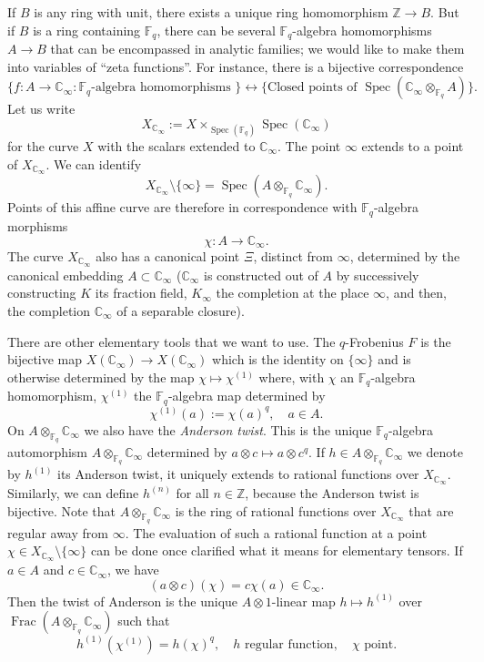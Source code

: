 \documentclass[11pt]{amsart}
\numberwithin{equation}{section}
\newcommand{\ZZ}{\mathbb{Z}}
\newcommand{\FF}{\mathbb{F}}
\newcommand{\CC}{\mathbb{C}}
\begin{document}
 If $B$ is any ring with unit, there exists a unique ring homomorphism $\ZZ\rightarrow B$. 
 But if $B$ is a ring containing $\FF_q$, there can be several $\FF_q$-algebra homomorphisms $A\rightarrow B$ that can be encompassed in analytic families; we would like to make them into variables of ``zeta functions''.
For instance, there is a bijective correspondence
$$\{f:A\rightarrow\CC_\infty:\FF_q\text{-algebra homomorphisms }\}\leftrightarrow\{\text{Closed points of } \operatorname{Spec}(\CC_\infty\otimes_{\FF_q}A)\}.$$
Let us write
$$X_{\CC_\infty}:=X\times_{\operatorname{Spec}(\FF_q)}\operatorname{Spec}(\CC_\infty)$$
for the curve $X$ with the scalars extended to $\CC_\infty$.
The point $\infty$ extends to a point of $X_{\CC_\infty}$. We can identify
$$X_{\CC_\infty}\setminus\{\infty\}=\operatorname{Spec}(A\otimes_{\FF_q}\CC_\infty).$$ Points of this affine curve are therefore
in correspondence with $\FF_q$-algebra morphisms
$$\chi:A\rightarrow\CC_\infty.$$
The curve $X_{\CC_\infty}$ also has a canonical point $\Xi$, distinct from $\infty$, determined by the canonical embedding $A\subset\CC_\infty$
($\CC_\infty$ is constructed out of $A$ by successively constructing $K$ its fraction field, $K_\infty$ the completion at the place $\infty$, and then, the completion $\CC_\infty$ of a separable closure). 

There are other elementary tools that we want to use. The $q$-Frobenius
$F$ is the bijective map $X(\CC_\infty)\rightarrow X(\CC_\infty)$ which is the identity on $\{\infty\}$ and is otherwise determined by the map
$\chi\mapsto\chi^{(1)}$ where, with $\chi$ an $\FF_q$-algebra homomorphism, $\chi^{(1)}$ the $\FF_q$-algebra map determined by
$$\chi^{(1)}(a):=\chi(a)^q,\quad a\in A.$$ 
On $A\otimes_{\FF_q}\CC_\infty$ we also have the {\em Anderson twist}. This is the unique $\FF_q$-algebra automorphism
$A\otimes_{\FF_q}\CC_\infty$ determined by $a\otimes c\mapsto a\otimes c^q$. If $h\in A\otimes_{\FF_q}\CC_\infty$ we denote by $h^{(1)}$ its Anderson twist, it uniquely extends to rational functions over $X_{\CC_\infty}$. Similarly, we can define $h^{(n)}$ for all $n\in\ZZ$, because the Anderson twist is bijective. Note that $A\otimes_{\FF_q}\CC_\infty$ is the ring of rational functions over $X_{\CC_\infty}$ that are regular away from $\infty$. The evaluation of such a rational function
at a point $\chi\in X_{\CC_\infty}\setminus\{\infty\}$ can be done once clarified what it means for elementary tensors. If $a\in A$ and $c\in\CC_\infty$, we have 
$$(a\otimes c)(\chi)=c\chi(a)\in\CC_\infty.$$
Then the twist of Anderson is the unique $A\otimes1$-linear map $h\mapsto h^{(1)}$ over $\operatorname{Frac}(A\otimes_{\FF_q}\CC_\infty)$ such that
$$h^{(1)}(\chi^{(1)})=h(\chi)^q,\quad h\text{ regular function},\quad \chi\text{ point.}$$
\end{document}
